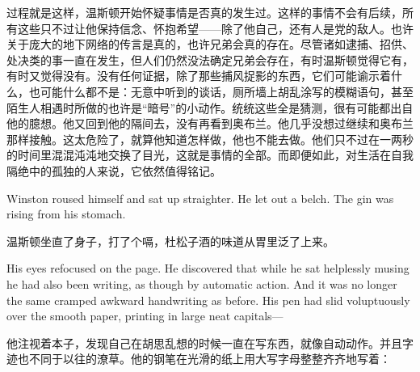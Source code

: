 \begin{paracol}{2}
\switchcolumn

过程就是这样，温斯顿开始怀疑事情是否真的发生过。这样的事情不会有后续，所有这些只不过让他保持信念、怀抱希望——除了他自己，还有人是党的敌人。也许关于庞大的地下网络的传言是真的，也许兄弟会真的存在。尽管诸如逮捕、招供、处决类的事一直在发生，但人们仍然没法确定兄弟会存在，有时温斯顿觉得它有，有时又觉得没有。没有任何证据，除了那些捕风捉影的东西，它们可能谕示着什么，也可能什么都不是：无意中听到的谈话，厕所墙上胡乱涂写的模糊语句，甚至陌生人相遇时所做的也许是``暗号''的小动作。统统这些全是猜测，很有可能都出自他的臆想。他又回到他的隔间去，没有再看到奥布兰。他几乎没想过继续和奥布兰那样接触。这太危险了，就算他知道怎样做，他也不能去做。他们只不过在一两秒的时间里混混沌沌地交换了目光，这就是事情的全部。而即便如此，对生活在自我隔绝中的孤独的人来说，它依然值得铭记。

\switchcolumn*

Winston roused himself and sat up straighter. He let out a belch. The
gin was rising from his stomach.

\switchcolumn

温斯顿坐直了身子，打了个嗝，杜松子酒的味道从胃里泛了上来。

\switchcolumn*

His eyes refocused on the page. He discovered that while he sat
helplessly musing he had also been writing, as though by automatic
action. And it was no longer the same cramped awkward handwriting as
before. His pen had slid voluptuously over the smooth paper, printing in
large neat capitals---

\switchcolumn

他注视着本子，发现自己在胡思乱想的时候一直在写东西，就像自动动作。并且字迹也不同于以往的潦草。他的钢笔在光滑的纸上用大写字母整整齐齐地写着：

\switchcolumn*


\switchcolumn


\switchcolumn*


\end{paracol}

